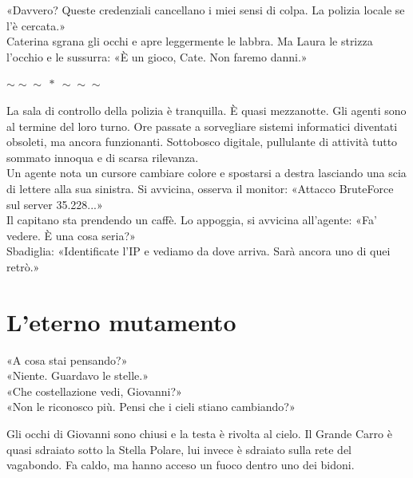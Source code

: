 \documentclass[10pt,oneside]{extbook}
\newcommand{\separatore}{\par
  \begin{center}
    {\Large $\sim\!\!\sim\!\!\sim\ \ast\ \sim\!\!\sim\!\!\sim$}
  \end{center}
  \par
}
\begin{document}
«Davvero? Queste credenziali cancellano i miei sensi di colpa. La polizia locale se l’\`e cercata.»\\
Caterina sgrana gli occhi e apre leggermente le labbra. Ma Laura le strizza l’occhio e le sussurra:
«\`E un gioco, Cate. Non faremo danni.»

\separatore

\par\medskip
La sala di controllo della polizia  \`e tranquilla. \`E quasi mezzanotte. Gli agenti sono al termine del loro turno. Ore passate a sorvegliare sistemi informatici diventati obsoleti, ma ancora funzionanti. Sottobosco digitale, pullulante di attività tutto sommato innoqua e di scarsa rilevanza.\\
Un agente nota un cursore cambiare colore e spostarsi a destra lasciando una scia di lettere alla sua sinistra. Si avvicina, osserva il monitor:
«Attacco BruteForce sul server 35.228...»\\
Il capitano sta prendendo un caff\`e. Lo appoggia, si avvicina all’agente: «Fa’ vedere. \`E una cosa seria?»\\
Sbadiglia: «Identificate l’IP e vediamo da dove arriva. Sarà ancora uno di quei retrò.»

\clearpage{}
\clearpage{}\chapter{L’eterno mutamento}

«A cosa stai pensando?»\\
«Niente. Guardavo le stelle.»\\
«Che costellazione vedi, Giovanni?»\\
«Non le riconosco pi\`u. Pensi che i cieli stiano cambiando?»





\par\medskip
Gli occhi di Giovanni sono chiusi e la testa \`e rivolta al cielo.
Il Grande Carro \`e quasi sdraiato sotto la Stella Polare,
lui invece \`e sdraiato sulla rete del vagabondo.
Fa caldo, ma hanno acceso un fuoco dentro uno dei bidoni.
\end{document}
